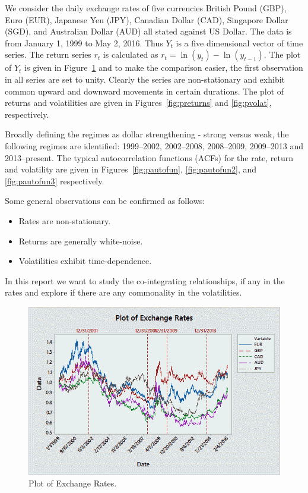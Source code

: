 We consider the daily exchange rates of five currencies British Pound (GBP), Euro (EUR), Japanese Yen (JPY), Canadian Dollar (CAD), Singapore Dollar (SGD), and Australian Dollar (AUD) all stated against US Dollar. The data is from January 1, 1999 to May 2, 2016. Thus $Y_t$ is a five dimensional vector of time series. The return series $r_t$ is calculated as $r_t=\ln(y_t) - \ln(y_{t-1})$. The plot of $Y_t$ is given in Figure~\ref{fig:pexchrate} and to make the comparison easier, the first observation in all series are set to unity. Clearly the series are non-stationary and exhibit common upward and downward movements in certain durations. The plot of returns and volatilities are given in Figures~\ref{fig:preturns} and \ref{fig:pvolat}, respectively. 


Broadly defining the regimes as dollar strengthening - strong versus weak, the following regimes are identified: 1999--2002, 2002--2008, 2008--2009, 2009--2013 and 2013--present. The typical autocorrelation functions (ACFs) for the rate, return and volatility are given in Figures~\ref{fig:pautofun}, \ref{fig:pautofun2}, and \ref{fig:pautofun3} respectively.


Some general observations can be confirmed as follows:
	\begin{itemize}
	\item Rates are non-stationary.
	\item Returns are generally white-noise.
	\item Volatilities exhibit time-dependence.
	\end{itemize}


In this report we want to study the co-integrating relationships, if any in the rates and explore if there are any commonality in the volatilities.

	\begin{figure}[!ht]
	\centering
	\includegraphics[width=\textwidth]{chapters/chapter_mvts/figures/pexchrate.png}
	\caption{Plot of Exchange Rates. \label{fig:pexchrate}}
	\end{figure}
	
